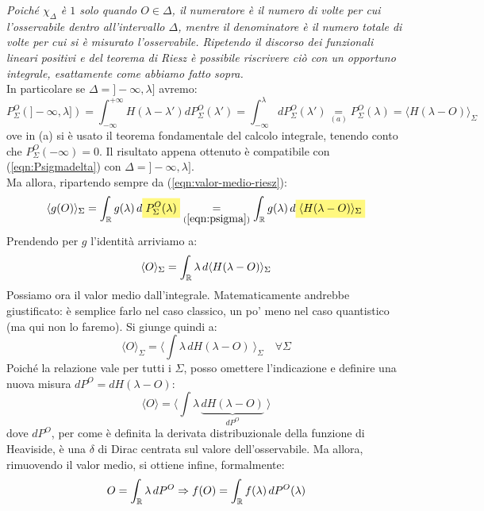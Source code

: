 \documentclass[FisicaTeorica.tex]{subfiles}
\begin{document}
\textit{Poiché $\chi_\Delta$ è $1$ solo quando $O \in \Delta$, il numeratore è il numero di volte per cui l'osservabile  dentro all'intervallo $\Delta$, mentre il denominatore è il numero totale di volte per cui si è misurato l'osservabile. Ripetendo il discorso dei funzionali lineari positivi e del teorema di Riesz è possibile riscrivere ciò con un opportuno integrale, esattamente come abbiamo fatto sopra.}\\
In particolare se $\Delta= ]-\infty, \lambda]$ avremo:
\begin{equation}
P_\Sigma^O(]-\infty,\lambda]) =
\int_{-\infty}^{+\infty} H(\lambda - \lambda') dP^O_\Sigma(\lambda') =
\int_{-\infty}^\lambda dP_\Sigma^O(\lambda') \underset{(a)}{=} P_\Sigma^O(\lambda) = \langle H(\lambda-O)\rangle_\Sigma
\label{eqn:psigma}
\end{equation}
ove in (a) si è usato il teorema fondamentale del calcolo integrale, tenendo conto che $P^O_\Sigma(-\infty) = 0$.
Il risultato appena ottenuto è compatibile con (\ref{eqn:Psigmadelta}) con $\Delta = ]-\infty,\lambda]$.
\\
Ma allora, ripartendo sempre da (\ref{eqn:valor-medio-riesz}):
\[
\langle g(O) \rangle_\Sigma = \int_\bb{R} g(\lambda)\, d\hlc{Yellow}{P_\Sigma^O(\lambda)} \underset{(\ref{eqn:psigma})}{=} \int_\bb{R} g(\lambda)\, d\hlc{Yellow}{\langle H(\lambda-O)\rangle_\Sigma}
\]
Prendendo per $g$ l'identità arriviamo a:
\begin{equation}
\langle O \rangle_\Sigma = \int_{\mathbb{R}} \lambda\, d\langle H(\lambda-O)\rangle_\Sigma
\label{eqn:Omedio}
\end{equation}
Possiamo ora  il valor medio dall'integrale. Matematicamente andrebbe giustificato: è semplice farlo nel caso classico, un po' meno nel caso quantistico (ma qui non lo faremo). Si giunge quindi a:
\[
\langle O \rangle_\Sigma = \langle \int \lambda\, dH(\lambda-O) \> \rangle_\Sigma\quad \forall \Sigma
\]
Poiché la relazione vale per tutti i $\Sigma$, posso omettere l'indicazione e definire una nuova misura $dP^O = dH(\lambda-O)$:
\[
\langle O \rangle = \langle \int \lambda \, \underbrace{dH(\lambda-O)}_{dP^O} \> \rangle
\]
dove $dP^O$, per come è definita la derivata distribuzionale della funzione di Heaviside, è una $\delta$ di Dirac centrata sul valore dell'osservabile. Ma allora, rimuovendo il valor medio, si ottiene infine, formalmente:
\begin{equation}
O = \int_{\mathbb{R}} \lambda\, dP^O \Rightarrow f(O) = \int_{\mathbb{R}} f(\lambda)\, dP^O(\lambda)
\label{eqn:osservabileformale}
\end{equation}
\end{document}
